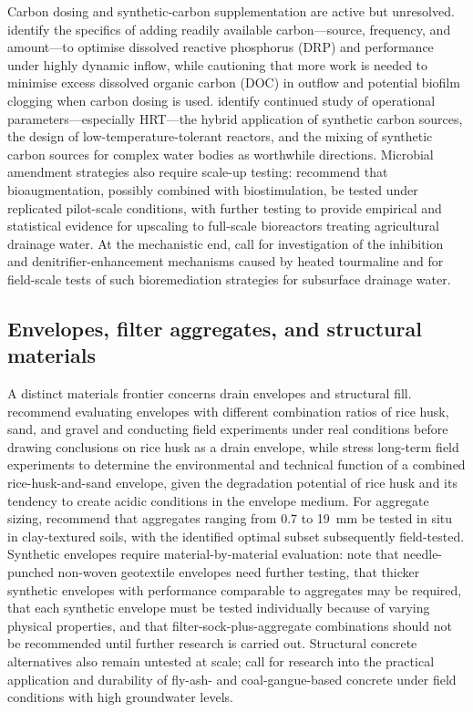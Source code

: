 Carbon dosing and synthetic-carbon supplementation are active but unresolved. \textcite{Rivas2020} identify the specifics of adding readily available carbon---source, frequency, and amount---to optimise dissolved reactive phosphorus (DRP) and performance under highly dynamic inflow, while cautioning that more work is needed to minimise excess dissolved organic carbon (DOC) in outflow and potential biofilm clogging when carbon dosing is used. \textcite{Zhang2021b} identify continued study of operational parameters---especially HRT---the hybrid application of synthetic carbon sources, the design of low-temperature-tolerant reactors, and the mixing of synthetic carbon sources for complex water bodies as worthwhile directions. Microbial amendment strategies also require scale-up testing: \textcite{Jeglot2022} recommend that bioaugmentation, possibly combined with biostimulation, be tested under replicated pilot-scale conditions, with further testing to provide empirical and statistical evidence for upscaling to full-scale bioreactors treating agricultural drainage water. At the mechanistic end, \textcite{Ma2021} call for investigation of the inhibition and denitrifier-enhancement mechanisms caused by heated tourmaline and for field-scale tests of such bioremediation strategies for subsurface drainage water.

\subsection{Envelopes, filter aggregates, and structural materials}
A distinct materials frontier concerns drain envelopes and structural fill. \textcite{Kaboosi2012} recommend evaluating envelopes with different combination ratios of rice husk, sand, and gravel and conducting field experiments under real conditions before drawing conclusions on rice husk as a drain envelope, while \textcite{Navabian2017} stress long-term field experiments to determine the environmental and technical function of a combined rice-husk-and-sand envelope, given the degradation potential of rice husk and its tendency to create acidic conditions in the envelope medium. For aggregate sizing, \textcite{Byrne2023} recommend that aggregates ranging from 0.7 to 19~mm be tested in situ in clay-textured soils, with the identified optimal subset subsequently field-tested. Synthetic envelopes require material-by-material evaluation: \textcite{Byrne2023b} note that needle-punched non-woven geotextile envelopes need further testing, that thicker synthetic envelopes with performance comparable to aggregates may be required, that each synthetic envelope must be tested individually because of varying physical properties, and that filter-sock-plus-aggregate combinations should not be recommended until further research is carried out. Structural concrete alternatives also remain untested at scale; \textcite{Wang2016c} call for research into the practical application and durability of fly-ash- and coal-gangue-based concrete under field conditions with high groundwater levels.

